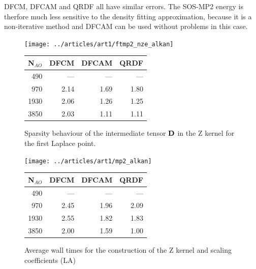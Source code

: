 DFCM, DFCAM and QRDF all have similar errors. The SOS-MP2 energy is therfore much less sensitive to the density fitting approximation, because it is a non-iterative method and DFCAM can be used without problems in this case. 

\begin{figure}
\begin{minipage}{0.5\textwidth}
\texttt{[image: ../articles/art1/ftmp2\_nze\_alkan]}
\end{minipage}
\begin{minipage}{0.4\textwidth}
\begin{tabular}{rrrr}
\hline
N$_{AO}$ & DFCM & DFCAM & QRDF \\ \hline
490 & --- & --- 	& --- \\ 
970	& 2.14 & 1.69 & 1.80 \\
1930	 & 2.06 & 1.26 & 1.25 \\
3850	 & 2.03 & 1.11 & 1.11 \\
 \hline
\end{tabular}
\end{minipage}
\caption{Sparsity behaviour of the intermediate tensor $\mathbf{D}$ in the Z kernel for the first Laplace point.}
\label{fig:GS_ZMEM_LA}
\end{figure}

\begin{figure}
\begin{minipage}{0.5\textwidth}
\centering
\texttt{[image: ../articles/art1/mp2\_alkan]}
\end{minipage}
\begin{minipage}{0.4\textwidth}
\centering
\begin{tabular}{rrrr}
\hline
N$_{AO}$ & DFCM & DFCAM & QRDF \\ \hline
490 & --- & --- 	& --- \\ 
970	& 2.45 & 1.96 & 2.09 \\
1930	 & 2.55 & 1.82 & 1.83 \\
3850	 & 2.00 & 1.59 & 1.00 \\
 \hline
\end{tabular}
\end{minipage}
\caption{Average wall times for the construction of the Z kernel and scaling coefficients (LA)}
\label{fig:GS_ZSCALE_LA}
\end{figure}

